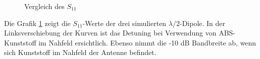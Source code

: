 
\begin{figure}[!ht]
	\centering
	\begingroup
	
	\endgroup
	\caption{Vergleich des $S_{11}$}
	\label{S11_Vergleich_Simulation}
\end{figure}
\newpage
Die Grafik \ref{S11_Vergleich_Simulation} zeigt die $S_{11}$-Werte der drei simulierten $\lambda/2$-Dipole. In der Linksverschiebung der Kurven ist das Detuning bei Verwendung von ABS-Kunststoff im Nahfeld ersichtlich. Ebenso nimmt die -10 dB Bandbreite ab, wenn sich Kunststoff im Nahfeld der Antenne befindet.


